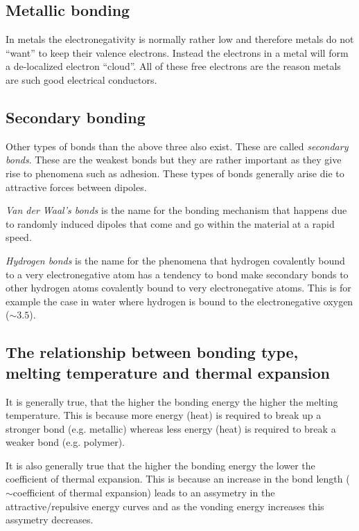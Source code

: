\subsection{Metallic bonding}
In metals the electronegativity is normally rather low and therefore metals do not ``want'' to keep their valence electrons. Instead the electrons in a metal will form a de-localized electron ``cloud''. All of these free electrons are the reason metals are such good electrical conductors.


\subsection{Secondary bonding}
Other types of bonds than the above three also exist. These are called \textit{secondary bonds}. These are the weakest bonds but they are rather important as they give rise to phenomena such as adhesion. These types of bonds generally arise die to attractive forces between dipoles. 

\textit{Van der Waal's bonds} is the name for the bonding mechanism that happens due to randomly induced dipoles that come and go within the material at a rapid speed.

\textit{Hydrogen bonds} is the name for the phenomena that hydrogen covalently bound to a very electronegative atom has a tendency to bond make secondary bonds to other hydrogen atoms covalently bound to very electronegative atoms. This is for example the case in water where hydrogen is bound to the electronegative oxygen ($\sim\num{3,5}$).

\subsection{The relationship between bonding type, melting temperature and thermal expansion}
It is generally true, that the higher the bonding energy the higher the melting temperature. This is because more energy (heat) is required to break up a stronger bond (e.g. metallic) whereas less energy (heat) is required to break a weaker bond (e.g. polymer).

It is also generally true that the higher the bonding energy the lower the coefficient of thermal expansion. This is because an increase in the bond length ($\sim$coefficient of thermal expansion) leads to an assymetry in the attractive/repulsive energy curves and as the vonding energy increases this assymetry decreases.
